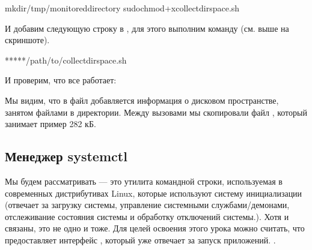 \documentclass[letterpaper,10pt,russian]{sphinxmanual}
\begin{document}
\begin{sphinxVerbatim}[commandchars=\\\{\}]
mkdir/tmp/monitored\PYGZus{}directory
sudochmod+xcollect\PYGZus{}dir\PYGZus{}space.sh
\end{sphinxVerbatim}

\sphinxAtStartPar
И добавим следующую строку в , для этого выполним команду  (см. выше на скриншоте).

\begin{sphinxVerbatim}[commandchars=\\\{\}]
*****/path/to/collect\PYGZus{}dir\PYGZus{}space.sh
\end{sphinxVerbatim}

\sphinxAtStartPar
{}

\sphinxAtStartPar
И проверим, что все работает:

\sphinxAtStartPar
{}

\sphinxAtStartPar
Мы видим, что в файл  добавляется информация о дисковом пространстве, занятом файлами в директории. Между вызовами  мы скопировали файл , который занимает пример 282 кБ.


\subsection{Менеджер systemctl}
\label{\detokenize{educational_materials/managers/content:systemctl}}
\sphinxAtStartPar
Мы будем рассматривать  — это утилита командной строки, используемая в современных дистрибутивах Linux, которые используют систему инициализации  (отвечает за загрузку системы, управление системными службами/демонами, отслеживание состояния системы и обработку отключений системы.). Хотя  и  связаны, это не одно и тоже. Для целей освоения этого урока можно считать, что  предоставляет интерфейс , который уже отвечает за запуск приложений. .
\end{document}
